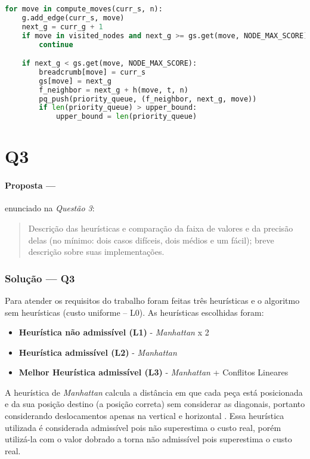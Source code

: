 \documentclass[12pt]{article}
\begin{document}
\begin{lstlisting}[language=Python]
for move in compute_moves(curr_s, n):
    g.add_edge(curr_s, move)
    next_g = curr_g + 1
    if move in visited_nodes and next_g >= gs.get(move, NODE_MAX_SCORE):
        continue

    if next_g < gs.get(move, NODE_MAX_SCORE):
        breadcrumb[move] = curr_s
        gs[move] = next_g
        f_neighbor = next_g + h(move, t, n)
        pq_push(priority_queue, (f_neighbor, next_g, move))
        if len(priority_queue) > upper_bound:
            upper_bound = len(priority_queue)
\end{lstlisting}

\section{Q3}

\paragraph{Proposta ---} enunciado na \textit{Questão 3}:

\begin{quote}
Descrição das heurísticas e comparação da faixa de valores e da precisão delas (no mínimo: dois casos difíceis, dois médios e um fácil); breve descrição sobre suas implementações.
\end{quote}

\subsubsection{Solução --- \textbf{Q3}}

Para atender os requisitos do trabalho foram feitas três heurísticas e o algoritmo sem heurísticas (custo uniforme – L0). As heurísticas escolhidas foram:

\begin{itemize}
    \item \textbf{Heurística não admissível (L1)} - \textit{Manhattan} x 2
    \item \textbf{Heurística admissível (L2)} - \textit{Manhattan}
    \item \textbf{Melhor Heurística admissível (L3)} - \textit{Manhattan} + Conflitos Lineares
\end{itemize}

A heurística de \textit{Manhattan} calcula a distância em que cada peça está posicionada e da sua posição destino (a posição correta) sem considerar as diagonais, portanto considerando deslocamentos apenas na vertical e horizontal \cite{sharma2016}. Essa heurística utilizada é considerada admissível pois não superestima o custo real, porém utilizá-la com o valor dobrado a torna não admissível pois superestima o custo real.
\end{document}
